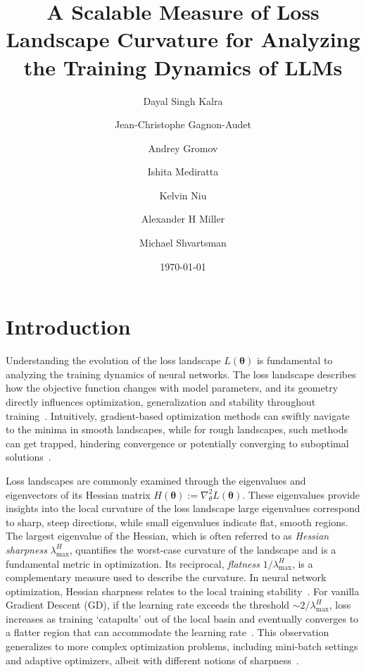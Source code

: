 \documentclass[]{fairmeta}
\title{A Scalable Measure of Loss Landscape Curvature for Analyzing the Training Dynamics of LLMs}
\author[1,2,*]{Dayal Singh Kalra}
\author[1]{Jean-Christophe Gagnon-Audet}
\author[1]{Andrey Gromov}
\author[1]{Ishita Mediratta}
\author[1]{Kelvin Niu}
\author[1]{Alexander H Miller}
\author[1]{Michael Shvartsman}
\affiliation[1]{FAIR at Meta}
\affiliation[2]{University of Maryland, College Park}
\date{\today}
\theoremstyle{plain}
\theoremstyle{definition}
\begin{document}
\maketitle

\section{Introduction}
\label{section:introduction}

Understanding the evolution of the loss landscape $L(\bm{\theta})$ is fundamental to analyzing the training dynamics of neural networks. The loss landscape describes how the objective function changes with model parameters, and its geometry directly influences optimization, generalization and stability throughout training~\citep{gilmer2022a,kalra2024why}. Intuitively, gradient-based optimization methods can swiftly navigate to the minima in smooth landscapes, while for rough landscapes, such methods can get trapped, hindering convergence or potentially converging to suboptimal solutions~\citep{losslandscapes}. 


Loss landscapes are commonly examined through the eigenvalues and eigenvectors of its Hessian matrix $H(\bm{\theta}):=\nabla_\theta^2 L(\bm{\theta})$. These eigenvalues provide insights into the local curvature of the loss landscape \textemdash large eigenvalues correspond to sharp, steep directions, while small eigenvalues indicate flat, smooth regions. 
The largest eigenvalue of the Hessian, which is often referred to as \emph{Hessian sharpness} $\lambda^H_{\max}$, quantifies the worst-case curvature of the landscape and is a fundamental metric in optimization. Its reciprocal, \emph{flatness} $1/\lambda_{\max}^H$, is a complementary measure used to describe the curvature.
In neural network optimization, Hessian sharpness relates to the local training stability~\citep{Wu2018_how_sgd,lewkowycz2020largelearningratephase}. For vanilla Gradient Descent (GD), if the learning rate exceeds the threshold $\sim 2/{\lambda_{\max}^H}$, loss increases as training `catapults' out of the local basin and eventually converges to a flatter region that can accommodate the learning rate~\citep{lewkowycz2020largelearningratephase}. 
This observation generalizes to more complex optimization problems, including mini-batch settings and adaptive optimizers, albeit with different notions of sharpness~\citep{Wu2018_how_sgd,agarwala2025highdimensionalanalysisreveals,cohen2024adaptivegradientmethodsedge,kalra2024why}. 
\end{document}
